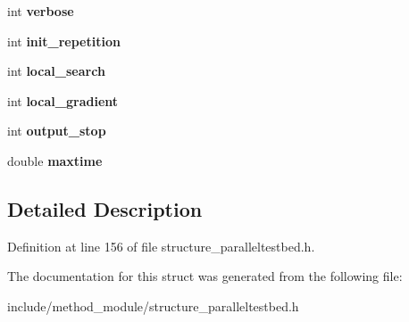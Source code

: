 \begin{DoxyCompactItemize}
\item 
\hypertarget{structexperiment__testbed_a7153a69d612c2760cd850ffb47d58fa9}{int {\bfseries verbose}}\label{structexperiment__testbed_a7153a69d612c2760cd850ffb47d58fa9}

\item 
\hypertarget{structexperiment__testbed_ab9460439c33113e5b5e8e8abda2462a0}{int {\bfseries init\-\_\-repetition}}\label{structexperiment__testbed_ab9460439c33113e5b5e8e8abda2462a0}

\item 
\hypertarget{structexperiment__testbed_a736927026b33b2c250b927d9a8bf76e7}{int {\bfseries local\-\_\-search}}\label{structexperiment__testbed_a736927026b33b2c250b927d9a8bf76e7}

\item 
\hypertarget{structexperiment__testbed_adbd6084c22c14c5570fdf3d3456b41a2}{int {\bfseries local\-\_\-gradient}}\label{structexperiment__testbed_adbd6084c22c14c5570fdf3d3456b41a2}

\item 
\hypertarget{structexperiment__testbed_ab3358de5e05b988e1cf76c8727239f88}{int {\bfseries output\-\_\-stop}}\label{structexperiment__testbed_ab3358de5e05b988e1cf76c8727239f88}

\item 
\hypertarget{structexperiment__testbed_a91373dadc69b58cdbd75adfceae6ffc7}{double {\bfseries maxtime}}\label{structexperiment__testbed_a91373dadc69b58cdbd75adfceae6ffc7}

\end{DoxyCompactItemize}


\subsection{Detailed Description}


Definition at line 156 of file structure\-\_\-paralleltestbed.\-h.



The documentation for this struct was generated from the following file\-:\begin{DoxyCompactItemize}
\item 
include/method\-\_\-module/structure\-\_\-paralleltestbed.\-h\end{DoxyCompactItemize}
